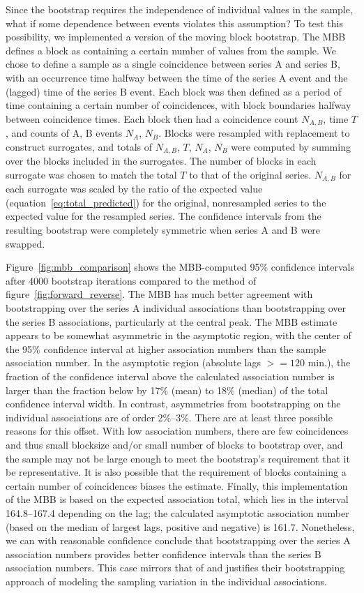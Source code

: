 \documentclass[letterpaper,11pt]{article}
\begin{document}
Since the bootstrap requires the independence of individual values in
the sample, what if some dependence between events violates this
assumption? To test this possibility, we implemented a version of the
moving block bootstrap. The MBB defines a block as containing a
certain number of values from the sample. We chose to define a sample
as a single coincidence between series A and series B, with an
occurrence time halfway between the time of the series A event and the
(lagged) time of the series B event. Each block was then defined as a
period of time containing a certain number of coincidences, with block
boundaries halfway between coincidence times. Each block then had a
coincidence count $N_{A,B}$, time $T$, and counts of A, B events
$N_A$, $N_B$. Blocks were resampled with replacement to construct
surrogates, and totals of $N_{A,B}$, $T$, $N_A$, $N_B$ were computed
by summing over the blocks included in the surrogates. The number of
blocks in each surrogate was chosen to match the total $T$ to that of
the original series. $N_{A,B}$ for each surrogate was scaled by the
ratio of the expected value (equation~\ref{eq:total_predicted}) for
the original, nonresampled series to the expected value for the
resampled series. The confidence intervals from the resulting
bootstrap were completely symmetric when series A and B were swapped.

Figure~\ref{fig:mbb_comparison} shows the MBB-computed 95\% confidence
intervals after 4000 bootstrap iterations compared to the method of
figure~\ref{fig:forward_reverse}. The MBB has much better agreement
with bootstrapping over the series A individual associations than
bootstrapping over the series B associations, particularly at the
central peak. The MBB estimate appears to be somewhat asymmetric in
the asymptotic region, with the center of the 95\% confidence interval
at higher association numbers than the sample association number. In
the asymptotic region (absolute lags $>=120$ min.), the fraction of
the confidence interval above the calculated association number is
larger than the fraction below by 17\% (mean) to 18\% (median) of the
total confidence interval width. In contrast, asymmetries from
bootstrapping on the individual associations are of order
2\%--3\%. There are at least three possible reasons for this
offset. With low association numbers, there are few coincidences and
thus small blocksize and/or small number of blocks to bootstrap over,
and the sample may not be large enough to meet the bootstrap's
requirement that it be representative. It is also possible that the
requirement of blocks containing a certain number of coincidences
biases the estimate. Finally, this implementation of the MBB is based
on the expected association total, which lies in the interval
164.8--167.4 depending on the lag; the calculated asymptotic
association number (based on the median of largest lags, positive and
negative) is 161.7. Nonetheless, we can with reasonable confidence
conclude that bootstrapping over the series A association numbers
provides better confidence intervals than the series B association
numbers. This case mirrors that of \citet{2007GeoRL..3408104M} and
justifies their bootstrapping approach of modeling the sampling
variation in the individual associations.
\end{document}
